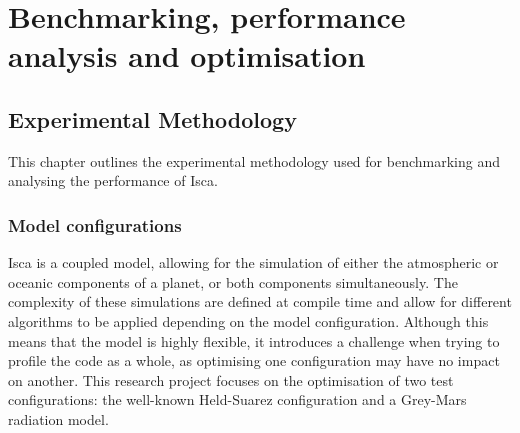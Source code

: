 \documentclass[a4paper,11pt]{report}
\begin{document}
\part{Benchmarking, performance analysis and optimisation}
\chapter{Experimental Methodology}
This chapter outlines the experimental methodology used for benchmarking and analysing the performance of Isca. 
%
%	
%	
%	
%	
%	
%	

\section{Model configurations}
Isca is a coupled model, allowing for the simulation of either the atmospheric or oceanic components of a planet, or both components simultaneously. The complexity of these simulations are defined at compile time and allow for different algorithms to be applied depending on the model configuration. Although this means that the model is highly flexible, it introduces a challenge when trying to profile the code as a whole, as optimising one configuration may have no impact on another. This research project focuses on the optimisation of two test configurations: the well-known Held-Suarez configuration and a Grey-Mars radiation model.
\end{document}
